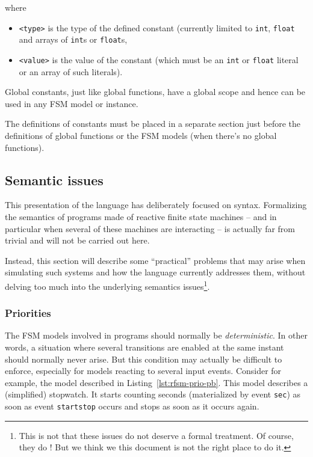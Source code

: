 \noindent
where
\begin{itemize}
\item \lstinline[language=Rfsm]|<type>| is the type of the defined constant (currently limited to
  \verb|int|, \verb|float| and arrays of \verb|int|s or \verb|float|s,
\item \lstinline[language=Rfsm]|<value>| is the value of the constant (which must be an \verb|int|
  or \verb|float| literal or an array of such literals).
\end{itemize}

Global constants, just like global functions, have a global scope and hence can be used in any FSM
model or instance.

The definitions of constants must be placed in a separate section just before the definitions of
global functions or the FSM models (when there's no global functions).

\subsection{Semantic issues}
\label{sec:semantic-issues}

This presentation of the language has deliberately focused on syntax. Formalizing the semantics of programs made of
reactive finite state machines -- and in particular when several of these machines are interacting
-- is actually far from trivial and will not be carried out here. 

Instead, this section will describe some ``practical'' problems that may arise when simulating such
systems and how the language currently addresses them, without delving too much into the underlying
semantics issues\footnote{This is not that these issues do not deserve a formal treatment. Of
  course, they do ! But we think we this document is not the right place to do it.}.

\subsubsection{Priorities}
\label{sec:priorities}

The FSM models involved in programs should normally be \emph{deterministic}. In other words, a
situation where several transitions are enabled at the same instant should normally never arise. But
this condition may actually be difficult to enforce, especially for models reacting to several input
events. Consider for example, the model described in Listing~\ref{lst:rfsm-prio-pb}. This model
describes a (simplified) stopwatch. It starts counting seconds (materialized by event \verb|sec|)
as soon as event \verb|startstop| occurs and stops as soon as it occurs again.

